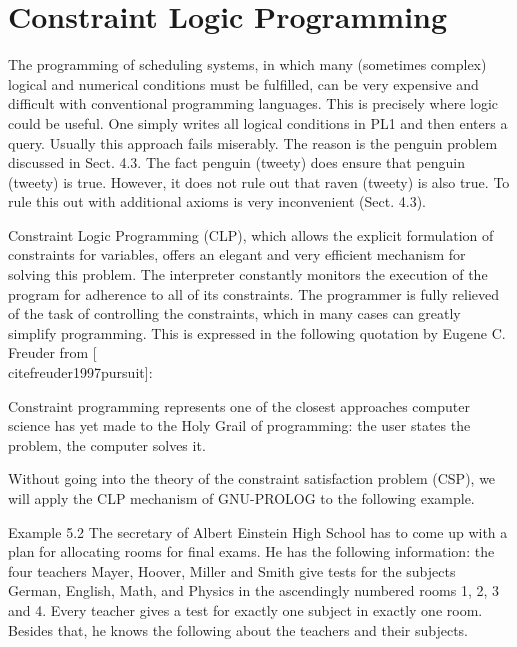 \documentclass[10pt]{book}
\begin{document}
\section{Constraint Logic Programming}
The programming of scheduling systems, in which many (sometimes complex) logical and numerical conditions must be fulfilled, can be very expensive and difficult with conventional programming languages. This is precisely where logic could be useful. One simply writes all logical conditions in PL1 and then enters a query. Usually this approach fails miserably. The reason is the penguin problem discussed in Sect. 4.3. The fact penguin (tweety) does ensure that penguin (tweety) is true. However, it does not rule out that raven (tweety) is also true. To rule this out with additional axioms is very inconvenient (Sect. 4.3).

Constraint Logic Programming (CLP), which allows the explicit formulation of constraints for variables, offers an elegant and very efficient mechanism for solving this problem. The interpreter constantly monitors the execution of the program for adherence to all of its constraints. The programmer is fully relieved of the task of controlling the constraints, which in many cases can greatly simplify programming. This is expressed in the following quotation by Eugene C. Freuder from [\\cite{freuder1997pursuit}]:


\begin{displayquote}
Constraint programming represents one of the closest approaches computer science has yet made to the Holy Grail of programming: the user states the problem, the computer solves it.
\end{displayquote}

Without going into the theory of the constraint satisfaction problem (CSP), we will apply the CLP mechanism of GNU-PROLOG to the following example.

Example 5.2 The secretary of Albert Einstein High School has to come up with a plan for allocating rooms for final exams. He has the following information: the four teachers Mayer, Hoover, Miller and Smith give tests for the subjects German, English, Math, and Physics in the ascendingly numbered rooms 1, 2, 3 and 4. Every teacher gives a test for exactly one subject in exactly one room. Besides that, he knows the following about the teachers and their subjects.
\end{document}
